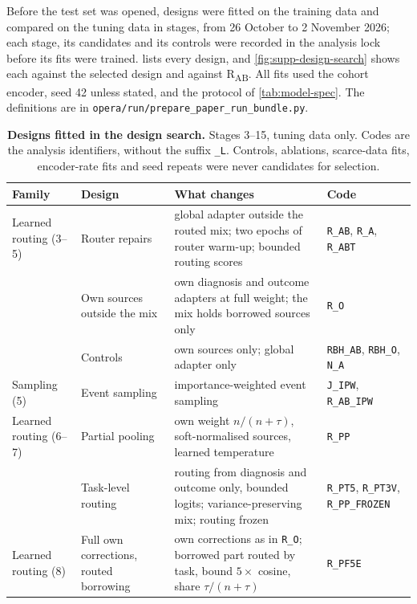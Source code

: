\label{sec:design-search}
Before the test set was opened, designs were fitted on the training data and
compared on the tuning data in stages, from 26 October to 2 November 2026; each
stage, its candidates and its controls were recorded in the analysis lock
before its fits were trained.  lists every design, and
\cref{fig:supp-design-search} shows each against the selected design and against
R\textsubscript{AB}. All fits used the cohort encoder, seed 42 unless stated,
and the protocol of \cref{tab:model-spec}. The definitions are in
\texttt{opera/run/prepare\_paper\_run\_bundle.py}.

\begin{table}[htbp]
\centering\footnotesize
\caption{\textbf{Designs fitted in the design search.} Stages 3--15, tuning data
only. Codes are the analysis identifiers, without the suffix \texttt{\_L}.
Controls, ablations, scarce-data fits, encoder-rate fits and seed repeats were
never candidates for selection.}
\label{tab:design-search}
\setlength{\tabcolsep}{3pt}
\renewcommand{\arraystretch}{0.92}
\begin{tabularx}{\textwidth}{@{}>{\raggedright\arraybackslash}p{}>{\raggedright\arraybackslash}p{}>{\raggedright\arraybackslash}X>{\raggedright\arraybackslash}p{}@{}}
\toprule
Family & Design & What changes & Code \\
\midrule
Learned routing (3--5) & Router repairs & global adapter outside the routed mix; two epochs of router warm-up; bounded routing scores & \texttt{R\_AB}, \texttt{R\_A}, \texttt{R\_ABT} \\
 & Own sources outside the mix & own diagnosis and outcome adapters at full weight; the mix holds borrowed sources only & \texttt{R\_O} \\
 & Controls & own sources only; global adapter only & \texttt{RBH\_AB}, \texttt{RBH\_O}, \texttt{N\_A} \\
Sampling (5) & Event sampling & importance-weighted event sampling & \texttt{J\_IPW}, \texttt{R\_AB\_IPW} \\
Learned routing (6--7) & Partial pooling & own weight $n/(n+\tau)$, soft-normalised sources, learned temperature & \texttt{R\_PP} \\
 & Task-level routing & routing from diagnosis and outcome only, bounded logits; variance-preserving mix; routing frozen & \texttt{R\_PT5}, \texttt{R\_PT3V}, \texttt{R\_PP\_FROZEN} \\
Learned routing (8) & Full own corrections, routed borrowing & own corrections as in \texttt{R\_O}; borrowed part routed by task, bound $5\times$ cosine, share $\tau/(n+\tau)$ & \texttt{R\_PF5E} \\

\end{tabularx}
\end{table}

